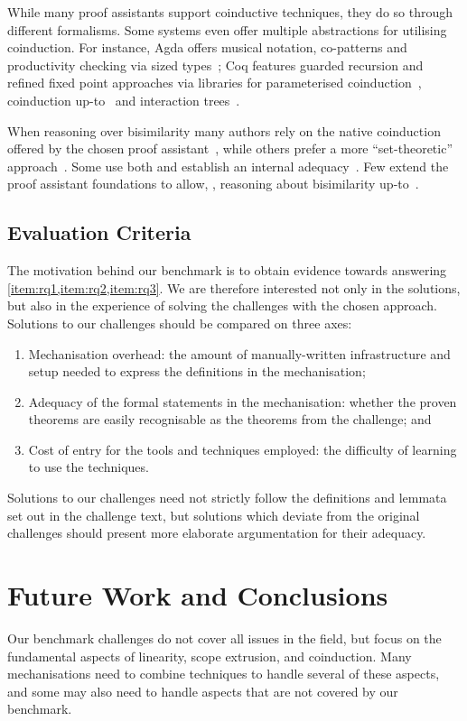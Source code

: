 \documentclass[runningheads]{llncs}
\begin{document}
While many proof assistants support coinductive techniques, they do so
through different formalisms.
Some systems even offer multiple abstractions for utilising coinduction.
For instance, Agda offers musical notation, co-patterns and productivity checking via sized types~\cite{Abel2013};
Coq features guarded recursion and refined fixed point approaches via libraries for \eg parameterised coinduction~\cite{Hur2013}, coinduction up-to~\cite{Pous16} and interaction trees~\cite{Xia2019}.

When reasoning over bisimilarity many authors rely on the native
coinduction offered by the chosen proof
assistant~\cite{Bengtson2016,Kahsai2008,Thiemann2019,Gay2020}, while
others prefer a more ``set-theoretic'' approach~\cite{Hirschkoff1997,Bengtson2009,Maksimovic2015,Pohjola2022}. Some
use both and establish an internal adequacy~\cite{Honsell2001}. Few
extend the proof assistant foundations to allow, \eg, reasoning about
bisimilarity up-to~\cite{ChaudhuriCM15}.

\subsection{Evaluation Criteria}
The motivation behind our benchmark is to obtain evidence towards answering
\cref{item:rq1,item:rq2,item:rq3}. We are therefore
interested not only in the solutions, but also in the experience of
solving the challenges with the chosen approach.  Solutions to our
challenges should be compared on three axes:
\begin{enumerate}
\item Mechanisation overhead: the amount of manually-written infrastructure and setup needed to express the definitions in the mechanisation;
\item Adequacy of the formal statements in the mechanisation: whether the proven theorems are easily recognisable as the theorems from the challenge; and
\item Cost of entry for the tools and techniques employed: the difficulty of learning to use the techniques.
\end{enumerate}
Solutions to our challenges need not strictly follow the definitions and lemmata set out in the challenge text, but solutions which deviate from the original challenges should present more elaborate argumentation for their adequacy.

\section{Future Work and Conclusions}\label{sec:going-beyond}
Our benchmark challenges do not cover all issues in the field, but focus on the fundamental aspects of linearity, scope extrusion, and coinduction.
Many mechanisations need to combine techniques to handle several of these aspects, and some may also need to handle aspects that are not covered by our benchmark.
\end{document}
